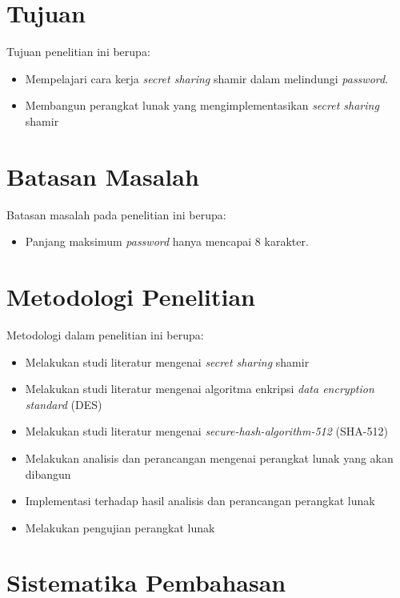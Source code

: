 \section{\textbf{Tujuan}}
\label{sec:tujuan}

Tujuan penelitian ini berupa:
\begin{itemize}
	\item Mempelajari cara kerja {\it secret sharing} shamir dalam melindungi {\it password}.
	\item Membangun perangkat lunak yang mengimplementasikan {\it secret sharing} shamir
\end{itemize}

\section{\textbf{Batasan Masalah}}
\label{sec:batasan masalah}

Batasan masalah pada penelitian ini berupa:
\begin{itemize}
	\item Panjang maksimum \textit{password} hanya mencapai 8 karakter.
\end{itemize}

\section{\textbf{Metodologi Penelitian}}
\label{sec:metodologi penelitian}

Metodologi dalam penelitian ini berupa:
\begin{itemize}
	\item Melakukan studi literatur mengenai {\it secret sharing} shamir
	\item Melakukan studi literatur mengenai algoritma enkripsi \textit{data encryption standard} (DES)
	\item Melakukan studi literatur mengenai \textit{secure-hash-algorithm-512} (SHA-512)
	\item Melakukan analisis dan perancangan mengenai perangkat lunak yang akan dibangun
	\item Implementasi terhadap hasil analisis dan perancangan perangkat lunak
	\item Melakukan pengujian perangkat lunak
\end{itemize}

\section{\textbf{Sistematika Pembahasan}}
\label{sec:sistematika pembahasan}

